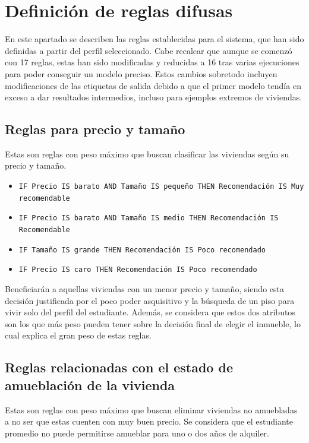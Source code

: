 \documentclass[12pt]{report} %
\begin{document}
    \section{Definición de reglas difusas}

    En este apartado se describen las reglas establecidas para el sistema, que
    han sido definidas a partir del perfil seleccionado. Cabe recalcar que
    aunque se comenzó con 17 reglas, estas han sido modificadas y reducidas a
    16 tras varias ejecuciones para poder conseguir un modelo preciso. Estos
    cambios sobretodo incluyen modificaciones de las etiquetas de salida
    debido a que el primer modelo tendía en exceso a dar resultados intermedios,
    incluso para ejemplos extremos de viviendas.

    \subsection{Reglas para precio y tamaño}
    Estas son reglas con peso máximo que buscan clasificar las viviendas según su precio y tamaño.

    \begin{itemize}
        \item \texttt{IF Precio IS barato AND Tamaño IS pequeño THEN Recomendación IS Muy recomendable}
        \item \texttt{IF Precio IS barato AND Tamaño IS medio THEN Recomendación IS Recomendable}
        \item \texttt{IF Tamaño IS grande THEN Recomendación IS Poco recomendado}
        \item \texttt{IF Precio IS caro THEN Recomendación IS Poco recomendado}
    \end{itemize}

    Beneficiarán a aquellas viviendas con un menor precio y tamaño, siendo 
    esta decisión justificada por el poco poder asquisitivo y la búsqueda de un piso para vivir solo
    del perfil del estudiante. Además, se considera que estos dos atributos son los que más peso 
    pueden tener sobre la decisión final de elegir el inmueble, lo cual explica el gran peso de 
    estas reglas.

    \subsection{Reglas relacionadas con el estado de amueblación de la vivienda}
    Estas son reglas con peso máximo que buscan eliminar viviendas no amuebladas a no 
    ser que estas cuenten con muy buen precio. Se considera que el estudiante 
    promedio no puede permitirse amueblar para uno o dos años de alquiler.
\end{document}

